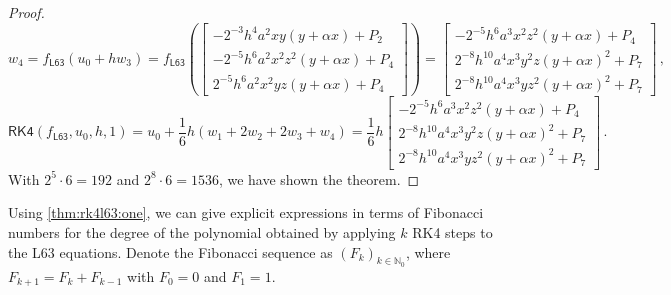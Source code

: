 \documentclass{article}
\newcommand{\N}{\mathbb{N}}
\newcommand{\lb}{\left(} %
\newcommand{\rb}{\right)} %
\newcommand{\br}[1]{\lb #1 \rb} %
\newcommand{\brOf}[1]{\!\br{#1}} %
\newcommand{\eqcm}{\,,} %
\newcommand{\eqfs}{\,.}
\begin{document}
\begin{proof}
\begin{equation*}
		w_4 = f_{\mathsf{L63}}\brOf{u_0 + h w_3}
		=
		f_{\mathsf{L63}}\brOf{
			\begin{bmatrix}
				-2^{-3}h^4a^2xy(y+\alpha x) + P_2\\
				-2^{-5}h^6a^2x^2z^2(y+\alpha x) + P_4\\
				2^{-5}h^6a^2x^2yz(y+\alpha x) + P_4
			\end{bmatrix}
		}
		=
		\begin{bmatrix}
			-2^{-5}h^6a^3x^2z^2(y+\alpha x) + P_4\\
			2^{-8}h^{10}a^4x^3y^2z(y+\alpha x)^2 + P_7\\
			2^{-8}h^{10}a^4x^3yz^2(y+\alpha x)^2 + P_7
		\end{bmatrix}
		\eqcm
	\end{equation*}
	\begin{equation*}
		\mathsf{RK4}\brOf{f_{\mathsf{L63}}, u_0, h, 1} = u_0 + \frac{1}{6} h (w_1 + 2w_2 + 2w_3 + w_4)
		=
		\frac{1}{6} h
		\begin{bmatrix}
			-2^{-5}h^6a^3x^2z^2(y+\alpha x) + P_4\\
			2^{-8}h^{10}a^4x^3y^2z(y+\alpha x)^2 + P_7\\
			2^{-8}h^{10}a^4x^3yz^2(y+\alpha x)^2 + P_7
		\end{bmatrix}
		\eqfs
	\end{equation*}
	With $2^5 \cdot 6 = 192$ and $2^8 \cdot 6 = 1536$, we have shown the theorem.
\end{proof}

Using \cref{thm:rk4l63:one}, we can give explicit expressions in terms of Fibonacci numbers for the degree of the polynomial obtained by applying $k$ RK4 steps to the L63 equations. 
Denote the Fibonacci sequence as $(F_k)_{k\in\N_0}$, where $F_{k+1} = F_k + F_{k-1}$ with $F_0 = 0$ and $F_1 = 1$. 
\end{document}
